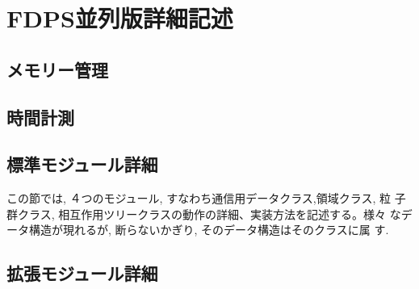 \section{FDPS並列版詳細記述}
\label{sec:detail}

\subsection{メモリー管理}
\label{sec:memory_management}



\subsection{時間計測}
\label{sec:memory_management}



\subsection{標準モジュール詳細}
\label{sec:detail_module}

この節では, ４つのモジュール, すなわち通信用データクラス,領域クラス, 粒
子群クラス, 相互作用ツリークラスの動作の詳細、実装方法を記述する。様々
なデータ構造が現れるが, 断らないかぎり, そのデータ構造はそのクラスに属
す.













\subsection{拡張モジュール詳細}
\label{sec:detail_option}




